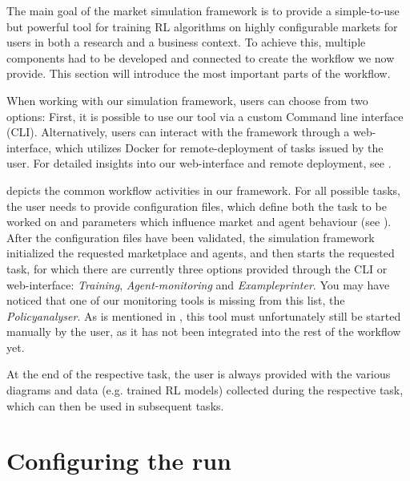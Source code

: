 \begin{jointwork}\label{ch:OurWorkflow}
	The main goal of the market simulation framework is to provide a simple-to-use but powerful tool for training RL algorithms on highly configurable markets for users in both a research and a business context. To achieve this, multiple components had to be developed and connected to create the workflow we now provide. This section will introduce the most important parts of the workflow.
\end{jointwork}

When working with our simulation framework, users can choose from two options: First, it is possible to use our tool via a custom Command line interface (CLI). Alternatively, users can interact with the framework through a web-interface, which utilizes Docker for remote-deployment of tasks issued by the user. For detailed insights into our web-interface and remote deployment, see \cite{JudithThesis}.

 depicts the common workflow activities in our framework. For all possible tasks, the user needs to provide configuration files, which define both the task to be worked on and parameters which influence market and agent behaviour (see ). After the configuration files have been validated, the simulation framework initialized the requested marketplace and agents, and then starts the requested task, for which there are currently three options provided through the CLI or web-interface: \emph{Training}, \emph{Agent-monitoring} and \emph{Exampleprinter}. You may have noticed that one of our monitoring tools is missing from this list, the \emph{Policyanalyser}. As is mentioned in , this tool must unfortunately still be started manually by the user, as it has not been integrated into the rest of the workflow yet.

At the end of the respective task, the user is always provided with the various diagrams and data (e.g. trained RL models) collected during the respective task, which can then be used in subsequent tasks.

\section{Configuring the run}\label{sec:ConfigureRun}

